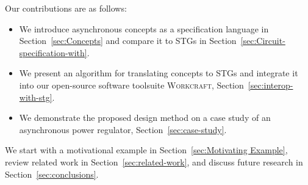 \documentclass[british, journal]{IEEEtran}
\newcommand{\noun}[1]{\textsc{#1}}
\begin{document}
Our contributions are as follows:
\begin{itemize}
  \item We introduce asynchronous concepts as a specification
  language in Section~\ref{sec:Concepts} and compare it to STGs in
  Section~\ref{sec:Circuit-specification-with}.
  \item We present an algorithm for translating concepts to STGs
  and integrate it into our open-source software toolsuite \noun{Workcraft},
  Section~\ref{sec:interop-with-stg}.
  \item We demonstrate the proposed design method on a case study of an
  asynchronous power regulator, Section~\ref{sec:case-study}.
\end{itemize}

\noindent
We start with a motivational example in Section~\ref{sec:Motivating Example}, review related work
in Section~\ref{sec:related-work}, and discuss future research in Section~\ref{sec:conclusions}.




\end{document}
